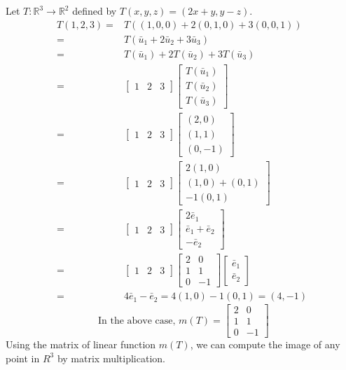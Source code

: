 \begin{commentary}
\begin{remark}[Example]
Let $T : \mathbb{R}^3 \to \mathbb{R}^2$ defined by $T(x,y,z)=(2x+y,y-z)$.
\begin{align*}
	T(1,2,3) = & T((1,0,0) + 2(0,1,0) + 3(0,0,1)) \\
	= & T(\bar{u}_1+2\bar{u}_2+3\bar{u}_3) \\
	= & T(\bar{u}_1) + 2T(\bar{u}_2) + 3T(\bar{u}_3) \\
	= & \begin{bmatrix} 1 & 2 & 3 \end{bmatrix} \begin{bmatrix} T(\bar{u}_1) \\ T(\bar{u}_2) \\ T(\bar{u}_3) \end{bmatrix} \\
	= & \begin{bmatrix} 1 & 2 & 3 \end{bmatrix} \begin{bmatrix} (2,0) \\ (1,1) \\ (0,-1) \end{bmatrix} \\
	= & \begin{bmatrix} 1 & 2 & 3 \end{bmatrix} \begin{bmatrix} 2(1,0) \\ (1,0)+(0,1) \\ -1(0,1) \end{bmatrix} \\
	= & \begin{bmatrix} 1 & 2 & 3 \end{bmatrix} \begin{bmatrix} 2\bar{e}_1 \\ \bar{e}_1+\bar{e}_2 \\ -\bar{e}_2 \end{bmatrix} \\
	= & \begin{bmatrix} 1 & 2 & 3 \end{bmatrix} \begin{bmatrix} 2 & 0 \\ 1 & 1 \\ 0 & -1 \end{bmatrix} \begin{bmatrix} \bar{e}_1 \\ \bar{e}_2 \end{bmatrix} \\
	= & 4\bar{e}_1-\bar{e}_2 = 4(1,0) - 1(0,1) = (4,-1)
\end{align*}
\[ \text{ In the above case, }m(T) = \begin{bmatrix} 2 & 0 \\ 1 & 1\\ 0 & -1 \end{bmatrix}\]
Using the matrix of linear function $m(T)$, we can compute the image of any point in $R^3$ by matrix multiplication.
\end{remark}
\end{commentary}

